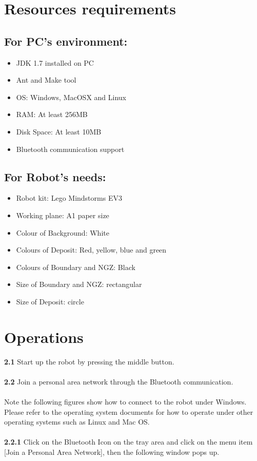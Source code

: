 \documentclass[11pt, a4paper]{article}
\begin{document}
\newpage


\setcounter{page}{1}

\section{Resources requirements}
\subsection{For PC's environment:}
\begin{itemize}
\item {JDK 1.7 installed on PC }
 \item {Ant and Make tool}
\item {OS: }Windows, MacOSX and Linux
\item {RAM: }At least 256MB
\item {Disk Space: } At least 10MB
\item {Bluetooth communication support}
\end{itemize}

\subsection{For Robot's needs:}
\begin{itemize}
\item {Robot kit: }Lego Mindstorms EV3
\item {Working plane: }A1 paper size
\item {Colour of Background: }White
\item {Colours of Deposit: } Red, yellow, blue and green
\item {Colours of Boundary and NGZ: }Black
\item {Size of Boundary and NGZ: }rectangular
\item {Size of Deposit: }circle
\end{itemize}



\section{Operations}
\indent\indent\textbf{2.1} Start up the robot by pressing the middle button.\\
\\
\indent\textbf{2.2} Join a personal area network through the Bluetooth communication.\\
\\
Note the following figures show how to connect to the robot under Windows. Please refer to the operating system documents for how to operate under other operating systems such as Linux and Mac OS.\\
\\
\indent\textbf{2.2.1} Click on the Bluetooth Icon on the tray area and click on the menu item [Join a Personal Area Network], then the following window pops up.\\
\end{document}
